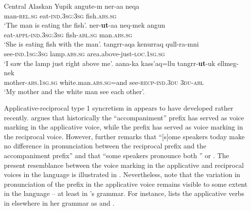 \ea Central Alaskan Yupik \citep[656, 844, 929, 953]{miyaoka:2012}
\ea\label{ex:CAY:eat:a}
	\gll	angute-m ner-aa neqa \\
			man-\textsc{rel.sg} eat-\textsc{ind.3sg:3sg} fish.\textsc{abs.sg} \\
	\glt	‘The man is eating the fish’.
\ex\label{ex:CAY:eat:b}
	\gll	ner-\textbf{ut}-aa neq-mek angun \\
			eat-\textsc{appl-ind.3sg:3sg} fish-\textsc{abl.sg} man.\textsc{abs.sg} \\
	\glt	‘She is eating fish with the man’.
\ex\label{ex:CAY:see:a}
	\gll	tangrr-aqa kenurraq qull-ra-mni \\
			see-\textsc{ind.1sg:3sg} lamp.\textsc{abs.sg} area.above-just-\textsc{loc.1sg.sg} \\
	\glt	‘I saw the lamp just right above me’.
\ex\label{ex:CAY:see:b}
	\gll	aana-ka kass’aq=llu tangrr-\textbf{ut}-uk ellmeg-nek \\
			mother-\textsc{abs.1sg.sg} white.man.\textsc{abs.sg}=and see-\textsc{recp-ind.3du} \textsc{3du-abl} \\
	\glt	‘My mother and the white man see each other’.
	\z 
\z

Applicative-reciprocal type 1 syncretism in  appears to have developed rather recently. \cite[251, 265]{linn:2000} argues that historically the “accompaniment” prefix  has served as voice marking in the applicative voice, while the prefix  has served as voice marking in the reciprocal voice. However, \cite[251]{linn:2000} further remarks that “[s]ome speakers today make no difference in pronunciation between the reciprocal prefix and the accompaniment prefix” and that “some speakers pronounce both ” or . The present resemblance between the voice marking in the applicative and reciprocal voices in the language is illustrated in . Nevertheless, note that the variation in pronunciation of the prefix in the applicative voice remains visible to some extent in the language -- at least in \citeauthor{linn:2000}’s grammar. For instance, \cite[254]{linn:2000} lists the applicative verbs in  elsewhere in her grammar as  and . 

